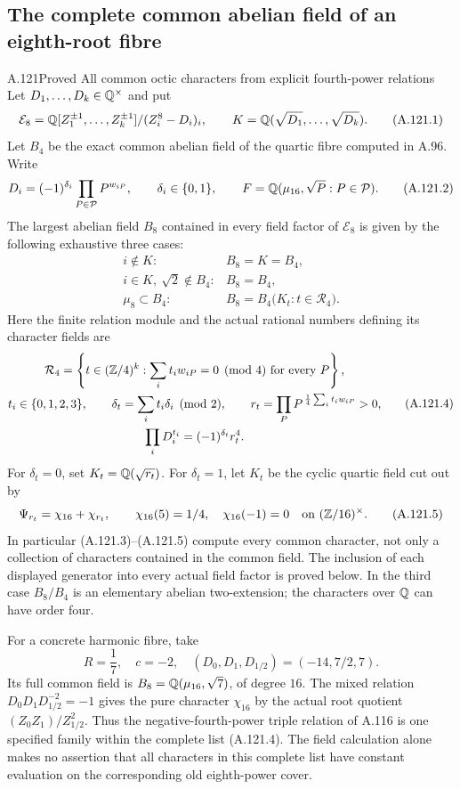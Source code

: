 \subsection{The complete common abelian field of an eighth-root fibre}

\begin{statement}{A.121}{Proved}
{All common octic characters from explicit fourth-power relations}
Let $D_1,\ldots,D_k\in\mathbb Q^\times$ and put
\[
 \mathcal E_8=\mathbb Q[Z_1^{\pm1},\ldots,Z_k^{\pm1}]
                      /(Z_i^8-D_i)_i,\qquad
 K=\mathbb Q(\sqrt{D_1},\ldots,\sqrt{D_k}).
\tag{A.121.1}
\]
Let $B_4$ be the exact common abelian field of the quartic
fibre computed in A.96.
Write
\[
 D_i=(-1)^{\delta_i}\prod_{P\in\mathcal P}P^{w_{iP}},
 \qquad \delta_i\in\{0,1\},\qquad
 F=\mathbb Q(\mu_{16},\sqrt P:P\in\mathcal P).
\tag{A.121.2}
\]
The largest abelian field $B_8$ contained in every field
factor of $\mathcal E_8$ is given by the following exhaustive
three cases:
\[
\begin{array}{ll}
 i\notin K:& B_8=K=B_4,\\
 i\in K,\ \sqrt2\notin B_4:& B_8=B_4,\\
 \mu_8\subset B_4:&
 B_8=B_4\bigl(K_t:t\in\mathcal R_4\bigr).
\end{array}
\tag{A.121.3}
\]
Here the finite relation module and the actual rational
numbers defining its character fields are
\[
 \begin{gathered}
 \mathcal R_4=
 \left\{t\in(\mathbb Z/4)^k:
            \sum_i t_iw_{iP}=0\pmod4\ \text{for every }P\right\},\\
 t_i\in\{0,1,2,3\},\qquad
 \delta_t=\sum_i t_i\delta_i\pmod2,\qquad
 r_t=\prod_P P^{\,\frac14\sum_i t_iw_{iP}}>0,\\
 \prod_iD_i^{t_i}=(-1)^{\delta_t}r_t^4 .
 \end{gathered}
\tag{A.121.4}
\]
For $\delta_t=0$, set $K_t=\mathbb Q(\sqrt{r_t})$.
For $\delta_t=1$, let $K_t$ be the cyclic quartic field
cut out by
\[
             \Psi_{r_t}=\chi_{16}+\chi_{r_t},
 \qquad
 \chi_{16}(5)=1/4,\quad\chi_{16}(-1)=0
                         \quad\text{on }(\mathbb Z/16)^\times.
\tag{A.121.5}
\]
In particular (A.121.3)--(A.121.5) compute every common
character, not only a collection of characters contained
in the common field.  The inclusion of each displayed
generator into every actual field factor is proved below.
In the third case $B_8/B_4$ is an elementary abelian
two-extension; the characters over $\mathbb Q$ can have order four.

For a concrete harmonic fibre, take
\[
 R=\frac17,\quad c=-2,\quad
 (D_0,D_1,D_{1/2})=(-14,7/2,7).
\tag{A.121.6}
\]
Its full common field is
$B_8=\mathbb Q(\mu_{16},\sqrt7)$, of degree $16$.
The mixed relation $D_0D_1D_{1/2}^{-2}=-1$ gives
the pure character $\chi_{16}$ by the actual root
quotient $(Z_0Z_1)/Z_{1/2}^2$.
Thus the negative-fourth-power triple relation of
A.116 is one specified family within the complete
list (A.121.4).
The field calculation alone makes no assertion that
all characters in this complete list have constant
evaluation on the corresponding old eighth-power cover.
\end{statement}
